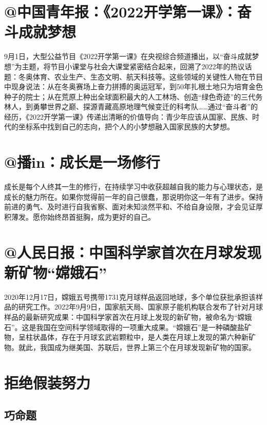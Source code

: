 
\section*{@中国青年报：《2022开学第一课》：奋斗成就梦想}

9月1日，大型公益节目《2022开学第一课》在央视综合频道播出，以“奋斗成就梦想”为主题，将节目小课堂与社会大课堂紧密结合起来，回溯了2022年的热议话题：冬奥体育、农业生产、生态文明、航天科技等。这些领域的关键性人物在节目中现身说法：从在冬奥赛场上奋力拼搏的奥运冠军，到50年扎根土地只为培育金色种子的院士；从在荒原上种出全球面积最大的人工林场、创造“绿色奇迹”的三代务林人，到勇攀世界之巅、探源青藏高原地理气候变迁的科考队……通过“奋斗者”的经历，《2022开学第一课》传递出清晰的价值导向：青少年应该从国家、民族、时代的坐标系中找到自己的志向，把个人的小梦想融入国家民族的大梦想。

\section*{@播in：成长是一场修行}

成长是每个人终其一生的修行，在持续学习中收获超越自我的能力与心理状态，是成长的魅力所在。如果你觉得前一年的自己很蠢，那说明你这一年有了进步。保持前进的勇气、及时进行自我省察、面对未知淡然平和、不给自身设限，才会见证厚积薄发。愿你始终昂首挺胸，成为更好的自己。

\section*{@人民日报：中国科学家首次在月球发现新矿物“嫦娥石”}

2020年12月17日，嫦娥五号携带1731克月球样品返回地球，多个单位获批承担该样品的研究工作。2022年9月9日，国家航天局、国家原子能机构联合发布了针对月球样品的最新研究成果：中国科学家首次在月球上发现的新矿物，被命名为“嫦娥石”。这是我国在空间科学领域取得的一项重大成果。“嫦娥石”是一种磷酸盐矿物，呈柱状晶体，存在于月球玄武岩颗粒中，是人类在月球上发现的第六种新矿物。就此，我国成为继美国、苏联后，世界上第三个在月球发现新矿物的国家。

\clearpage
\section*{拒绝假装努力}

\subsection*{巧命题}

